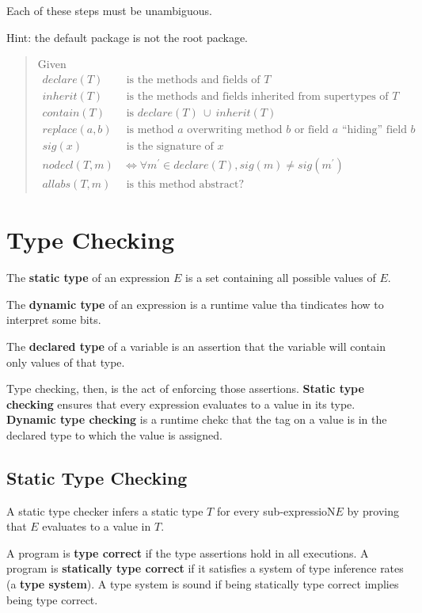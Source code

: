 \documentclass[12pt]{article}
\begin{document}
Each of these steps must be unambiguous.

Hint: the default package is not the root package.

\begin{quote}
Given
\begin{align*}
declare(T)& \text{ is the methods and fields of } T \\
inherit(T)& \text{ is the methods and fields inherited from supertypes of } T \\
contain(T)& \text{ is } declare(T)\ \cup\ inherit(T) \\
replace(a, b)& \text{ is method } a \text{ overwriting method } b \text{ or field } a \text{ ``hiding'' field } b \\
sig(x)& \text{ is the signature of } x \\
nodecl(T, m)& \iff \forall m^\prime \in declare(T), sig(m) \neq sig(m^\prime) \\
allabs(T, m)& \text{ is this method abstract? }
\end{align*}
\end{quote}

\section{Type Checking}
The {\bf static type} of an expression $E$ is a set containing all possible values of $E$.

The {\bf dynamic type} of an expression is a runtime value tha tindicates how to interpret some bits.

The {\bf declared type} of a variable is an assertion that the variable will contain only values of that type.

Type checking, then, is the act of enforcing those assertions. {\bf Static type checking} ensures that every expression evaluates to a value in its type. {\bf Dynamic type checking} is a runtime chekc that the tag on a value is in the declared type to which the value is assigned.

\subsection{Static Type Checking}
A static type checker infers a static type $T$ for every sub-expressioN$E$ by proving that $E$ evaluates to a value in $T$.

A program is {\bf type correct} if the type assertions hold in all executions. A program is {\bf statically type correct} if it satisfies a system of type inference rates (a {\bf type system}). A type system is sound if being statically type correct implies being type correct.
\end{document}
